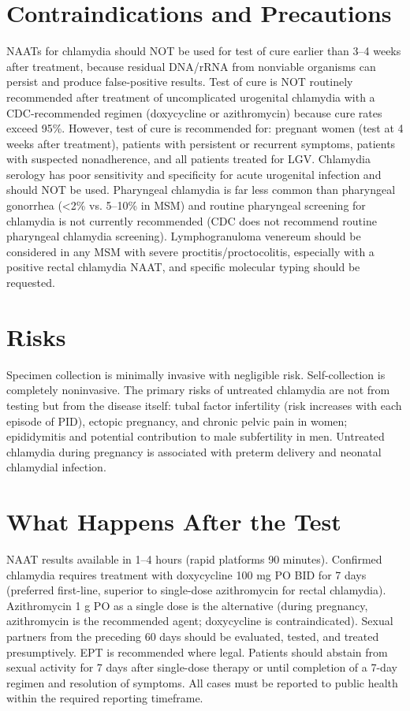 \section*{Contraindications and Precautions}
NAATs for chlamydia should NOT be used for test of cure earlier than 3--4 weeks after treatment, because residual DNA/rRNA from nonviable organisms can persist and produce false-positive results. Test of cure is NOT routinely recommended after treatment of uncomplicated urogenital chlamydia with a CDC-recommended regimen (doxycycline or azithromycin) because cure rates exceed 95\%. However, test of cure is recommended for: pregnant women (test at 4 weeks after treatment), patients with persistent or recurrent symptoms, patients with suspected nonadherence, and all patients treated for LGV. Chlamydia serology has poor sensitivity and specificity for acute urogenital infection and should NOT be used. Pharyngeal chlamydia is far less common than pharyngeal gonorrhea (<2\% vs. 5--10\% in MSM) and routine pharyngeal screening for chlamydia is not currently recommended (CDC does not recommend routine pharyngeal chlamydia screening). Lymphogranuloma venereum should be considered in any MSM with severe proctitis/proctocolitis, especially with a positive rectal chlamydia NAAT, and specific molecular typing should be requested.

\section*{Risks}
Specimen collection is minimally invasive with negligible risk. Self-collection is completely noninvasive. The primary risks of untreated chlamydia are not from testing but from the disease itself: tubal factor infertility (risk increases with each episode of PID), ectopic pregnancy, and chronic pelvic pain in women; epididymitis and potential contribution to male subfertility in men. Untreated chlamydia during pregnancy is associated with preterm delivery and neonatal chlamydial infection.

\section*{What Happens After the Test}
NAAT results available in 1--4 hours (rapid platforms 90 minutes). Confirmed chlamydia requires treatment with doxycycline 100 mg PO BID for 7 days (preferred first-line, superior to single-dose azithromycin for rectal chlamydia). Azithromycin 1 g PO as a single dose is the alternative (during pregnancy, azithromycin is the recommended agent; doxycycline is contraindicated). Sexual partners from the preceding 60 days should be evaluated, tested, and treated presumptively. EPT is recommended where legal. Patients should abstain from sexual activity for 7 days after single-dose therapy or until completion of a 7-day regimen and resolution of symptoms. All cases must be reported to public health within the required reporting timeframe.

